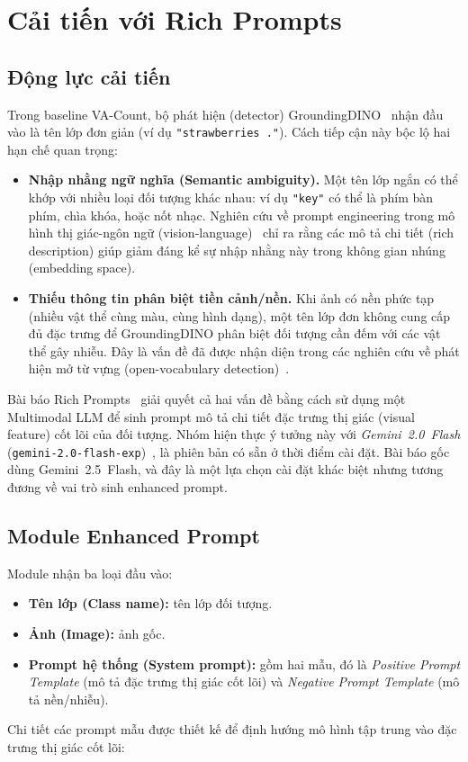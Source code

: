\documentclass[a4paper,12pt]{report}
\numberwithin{figure}{chapter}
\numberwithin{table}{chapter}
\begin{document}
\section{Cải tiến với Rich Prompts}
\label{sec:rich-prompts}

\subsection{Động lực cải tiến}

Trong baseline VA-Count, bộ phát hiện (detector) GroundingDINO~\cite{groundingdino} nhận đầu vào là tên lớp đơn giản (ví dụ \texttt{"strawberries ."}). Cách tiếp cận này bộc lộ hai hạn chế quan trọng:

\begin{itemize}
    \item \textbf{Nhập nhằng ngữ nghĩa (Semantic ambiguity).} Một tên lớp ngắn có thể khớp với nhiều loại đối tượng khác nhau: ví dụ \texttt{"key"} có thể là phím bàn phím, chìa khóa, hoặc nốt nhạc. Nghiên cứu về prompt engineering trong mô hình thị giác-ngôn ngữ (vision-language)~\cite{coop} chỉ ra rằng các mô tả chi tiết (rich description) giúp giảm đáng kể sự nhập nhằng này trong không gian nhúng (embedding space).
    \item \textbf{Thiếu thông tin phân biệt tiền cảnh/nền.} Khi ảnh có nền phức tạp (nhiều vật thể cùng màu, cùng hình dạng), một tên lớp đơn không cung cấp đủ đặc trưng để GroundingDINO phân biệt đối tượng cần đếm với các vật thể gây nhiễu. Đây là vấn đề đã được nhận diện trong các nghiên cứu về phát hiện mở từ vựng (open-vocabulary detection)~\cite{ovdet_survey}.
\end{itemize}
Bài báo Rich Prompts~\cite{richprompts} giải quyết cả hai vấn đề bằng cách sử dụng một Multimodal LLM để sinh prompt mô tả chi tiết đặc trưng thị giác (visual feature) cốt lõi của đối tượng. Nhóm hiện thực ý tưởng này với \emph{Gemini~2.0~Flash} (\texttt{gemini-2.0-flash-exp})~\cite{gemini}, là phiên bản có sẵn ở thời điểm cài đặt. Bài báo gốc dùng Gemini~2.5~Flash, và đây là một lựa chọn cài đặt khác biệt nhưng tương đương về vai trò sinh enhanced prompt.

\subsection{Module Enhanced Prompt}
\label{subsec:enhanced-prompt}

Module nhận ba loại đầu vào:
\begin{itemize}
    \item \textbf{Tên lớp (Class name):} tên lớp đối tượng.
    \item \textbf{Ảnh (Image):} ảnh gốc.
    \item \textbf{Prompt hệ thống (System prompt):} gồm hai mẫu, đó là \textit{Positive Prompt Template} (mô tả đặc trưng thị giác cốt lõi) và \textit{Negative Prompt Template} (mô tả nền/nhiễu).
\end{itemize}
Chi tiết các prompt mẫu được thiết kế để định hướng mô hình tập trung vào
đặc trưng thị giác cốt lõi:
\end{document}
